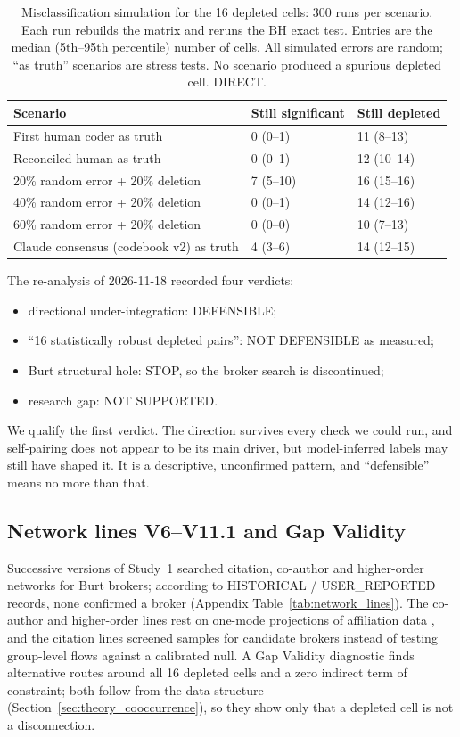 \begin{table}[tbp]
  \centering
  \small
  \caption{Misclassification simulation for the 16 depleted cells: 300 runs per scenario. Each run rebuilds the matrix and reruns the BH exact test. Entries are the median (5th--95th percentile) number of cells. All simulated errors are random; ``as truth'' scenarios are stress tests. No scenario produced a spurious depleted cell. DIRECT.}
  \label{tab:misclass}
  \begin{tabular}{lll}
    \toprule
    Scenario & Still significant & Still depleted \\
    \midrule
    First human coder as truth & 0 (0--1) & 11 (8--13) \\
    Reconciled human as truth & 0 (0--1) & 12 (10--14) \\
    20\% random error + 20\% deletion & 7 (5--10) & 16 (15--16) \\
    40\% random error + 20\% deletion & 0 (0--1) & 14 (12--16) \\
    60\% random error + 20\% deletion & 0 (0--0) & 10 (7--13) \\
    Claude consensus (codebook v2) as truth & 4 (3--6) & 14 (12--15) \\
    \bottomrule
  \end{tabular}
\end{table}

The re-analysis of 2026-11-18 recorded four verdicts:
\begin{itemize}
  \item directional under-integration: DEFENSIBLE;
  \item ``16 statistically robust depleted pairs'': NOT DEFENSIBLE as measured;
  \item Burt structural hole: STOP, so the broker search is discontinued;
  \item research gap: NOT SUPPORTED.
\end{itemize}
We qualify the first verdict. The direction survives every check we could run, and self-pairing does not appear to be its main driver, but model-inferred labels may still have shaped it. It is a descriptive, unconfirmed pattern, and ``defensible'' means no more than that.

\subsection{Network lines V6--V11.1 and Gap Validity}
\label{sec:study1_network}

Successive versions of Study~1 searched citation, co-author and higher-order networks for Burt brokers; according to HISTORICAL / USER\_REPORTED records, none confirmed a broker (Appendix Table~\ref{tab:network_lines}). The co-author and higher-order lines rest on one-mode projections of affiliation data \citep{newman2001scientific}, and the citation lines screened samples for candidate brokers instead of testing group-level flows against a calibrated null. A Gap Validity diagnostic finds alternative routes around all 16 depleted cells and a zero indirect term of constraint; both follow from the data structure (Section~\ref{sec:theory_cooccurrence}), so they show only that a depleted cell is not a disconnection.

